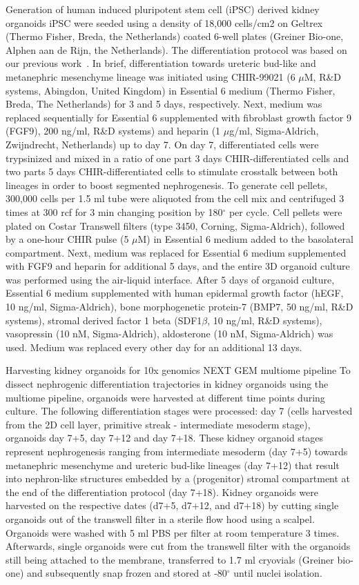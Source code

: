 Generation of human induced pluripotent stem cell (iPSC) derived kidney organoids iPSC were seeded using a density of 18,000 cells/cm2 on Geltrex (Thermo Fisher, Breda, the Netherlands) coated 6-well plates (Greiner Bio-one, Alphen aan de Rijn, the Netherlands). The differentiation protocol was based on our previous work~\citep{jansen2022sars}. In brief, differentiation towards ureteric bud-like and metanephric mesenchyme lineage was initiated using CHIR-99021 (6 $\mu$M, R\&D systems, Abingdon, United Kingdom) in Essential 6 medium (Thermo Fisher, Breda, The Netherlands) for 3 and 5 days, respectively. Next, medium was  replaced sequentially for Essential 6 supplemented with fibroblast growth factor 9 (FGF9), 200 ng/ml, R\&D systems) and heparin (1 $\mu$g/ml, Sigma-Aldrich, Zwijndrecht, Netherlands) up to day 7. On day 7, differentiated cells were trypsinized and mixed in a ratio of one part 3 days CHIR-differentiated cells and two parts 5 days CHIR-differentiated cells to stimulate crosstalk between both lineages in order to boost segmented nephrogenesis. To generate cell pellets, 300,000 cells per 1.5 ml tube were aliquoted from the cell mix and centrifuged 3 times at 300 rcf for 3 min changing position by 180$^\circ$ per cycle. Cell pellets were plated on Costar Transwell filters (type 3450, Corning, Sigma-Aldrich), followed by a one-hour CHIR pulse (5 $\mu$M) in Essential 6 medium added to the basolateral compartment. Next, medium was replaced for Essential 6 medium supplemented with FGF9 and heparin for additional 5 days, and the entire 3D organoid culture was performed using the air-liquid interface. After 5 days of organoid culture, Essential 6 medium supplemented with human epidermal growth factor (hEGF, 10 ng/ml, Sigma-Aldrich), bone morphogenetic protein-7 (BMP7, 50 ng/ml, R\&D systems), stromal derived factor 1 beta (SDF1$\beta$, 10 ng/ml, R\&D systems), vasopressin (10 nM, Sigma-Aldrich), aldosterone (10 nM, Sigma-Aldrich) was used. Medium was replaced every other day for an additional 13 days. 

Harvesting kidney organoids for 10x genomics NEXT GEM multiome pipeline
To dissect nephrogenic differentiation trajectories in kidney organoids using the multiome pipeline, organoids were harvested at different time points during culture. The following differentiation stages were processed:  day 7 (cells harvested from the 2D cell layer, primitive streak - intermediate mesoderm stage), organoids day 7+5, day 7+12 and day 7+18. These kidney organoid stages represent nephrogenesis ranging from intermediate mesoderm (day 7+5) towards metanephric mesenchyme and ureteric bud-like lineages (day 7+12) that result into nephron-like structures embedded by a (progenitor) stromal compartment at the end of the differentiation protocol (day 7+18). Kidney organoids were harvested on the respective dates (d7+5, d7+12, and d7+18) by cutting single organoids out of the transwell filter in a sterile flow hood using a scalpel. Organoids were washed with 5 ml PBS per filter at room temperature 3 times. Afterwards, single organoids were cut from the transwell filter with the organoids still being attached to the membrane, transferred to 1.7 ml cryovials (Greiner bio-one) and subsequently snap frozen and stored at -80$^\circ$ until nuclei isolation. 

